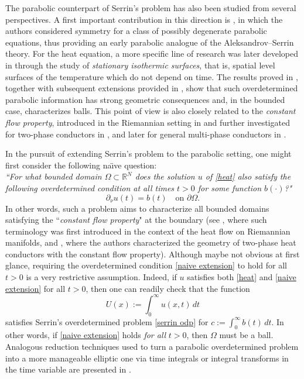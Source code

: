 \documentclass[a4paper,11pt]{article}
\newcommand{\cdottone}{{\boldsymbol{\cdot}}}
\numberwithin{equation}{section}
\begin{document}
The parabolic counterpart of Serrin's problem has also been studied from several perspectives. 
A first important contribution in this direction is \cite{MR1011556}, in which the authors considered symmetry for a class of possibly degenerate parabolic equations, thus providing an early parabolic analogue of the Aleksandrov--Serrin theory. For the heat equation, a more specific line of research was later developed in \cite{MR2231874} through the study of \emph{stationary isothermic surfaces}, that is, spatial level surfaces of the temperature which do not depend on time. The results proved in \cite{MR2231874}, together with subsequent extensions provided in \cite{MR2375699}, show that such overdetermined parabolic information has strong geometric consequences and, in the bounded case, characterizes balls. This point of view is also closely related to the \emph{constant flow property}, introduced in the Riemannian setting in \cite{BisSavo, savo2016heat} and further investigated for two-phase conductors in \cite{CavallinaMagnaniniSakaguchi2021constantflowproperty}, and later for general multi-phase conductors in \cite{cavallina_poggesi2025elliptic&parabolic}. 

In the pursuit of extending Serrin's problem to the parabolic setting, one might first consider the following na\"{\i}ve question:\\
\emph{``For what bounded domain $\Omega\subset\mathbb{R}^N$ does the solution $u$ of \eqref{heat} also satisfy the following overdetermined condition at all times $t>0$ for some function $b(\cdottone)$?"}
\begin{equation}\label{naive extension}
\partial_\nu u(t)=b(t)\quad \text{on }\partial\Omega.
\end{equation}
In other words, such a problem aims to characterize all bounded domains satisfying the ``\emph{constant flow property}" at the boundary (see \cite{savo2016heat}, where such terminology was first introduced in the context of the heat flow on Riemannian manifolds, and \cite{CavallinaMagnaniniSakaguchi2021constantflowproperty}, where the authors characterized the geometry of two-phase heat conductors with the constant flow property).
Although maybe not obvious at first glance, requiring the overdetermined condition \eqref{naive extension} to hold for all $t>0$ is a very restrictive assumption. Indeed, if $u$ satisfies both \eqref{heat} and \eqref{naive extension} for all $t>0$, then one can readily check that the function
\begin{equation*}
U(x):=\int_0^\infty u(x,t)\, dt    
\end{equation*}
satisfies Serrin's overdetermined problem \eqref{serrin odp} for $c:= \int_0^\infty b(t)\, dt$. In other words, if \eqref{naive extension} holds \emph{for all} $t>0$, then $\Omega$ must be a ball. Analogous reduction techniques used to turn a parabolic overdetermined problem into a more manageable elliptic one via time integrals or integral transforms in the time variable are presented in \cite{sakaguchi2016rendiconti, Sakaguchi_hyperplanes2020, sakaguchibessatsu, CavallinaMagnaniniSakaguchi2021constantflowproperty,  cavallina_poggesi2025elliptic&parabolic}.
\end{document}

